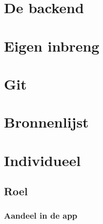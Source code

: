\documentclass[dutch]{report}
\begin{document}
	
	\section{De backend}
	
	\section{Eigen inbreng}
	
	\section{Git}
	
	\section{Bronnenlijst}
	
	\newpage
	\section{Individueel}
	
	\subsection{Roel}

	\subsubsection{Aandeel in de app}
\end{document}
